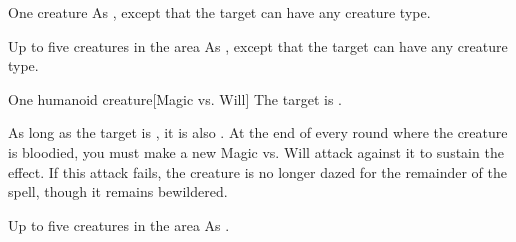 \begin{spellheader}
    \spellrng{\rngclose}
\end{spellheader}
\begin{spelleffects}
    \begin{spelltarget}{One creature}
        \spellsuccess As , except that the target can have any creature type.
    \end{spelltarget}
\end{spelleffects}

\begin{spellheader}
\end{spellheader}
\begin{spelleffects}
    \begin{spelltargets}{Up to five creatures in the area}
        \spellsuccess As , except that the target can have any creature type.
    \end{spelltargets}
\end{spelleffects}

\begin{spellheader}
    \spellrng{\rngclose}
\end{spellheader}
\begin{spelleffects}
    \begin{spelltarget}{One humanoid creature}[Magic vs. Will]
        \spellsuccess The target is \bewildered.

        As long as the target is \bloodied, it is also \dazed. At the end of every round where the creature is bloodied, you must make a new Magic vs. Will attack against it to sustain the effect. If this attack fails, the creature is no longer dazed for the remainder of the spell, though it remains bewildered.
    \end{spelltarget}
\end{spelleffects}

\begin{spellheader}
\end{spellheader}
\begin{spelleffects}
    \begin{spelltargets}{Up to five creatures in the area}
        \spellsuccess As .
    \end{spelltargets}
\end{spelleffects}

